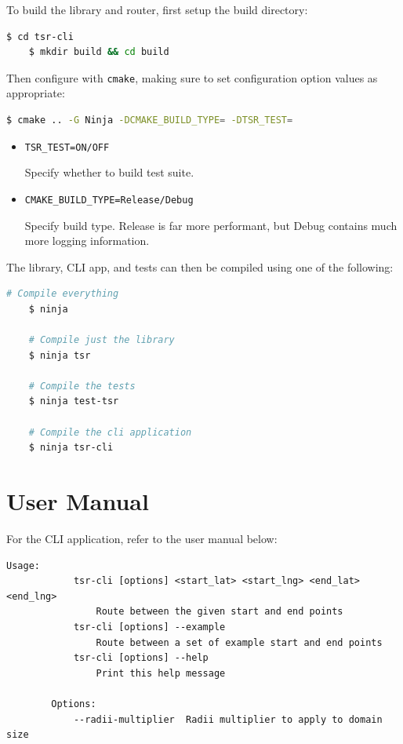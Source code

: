 \documentclass[12pt]{article}
\begin{document}
\begin{appendices}
  To build the library and router, first setup the build directory:

  \begin{lstlisting}[language=bash]
	$ cd tsr-cli
	$ mkdir build && cd build
\end{lstlisting}

  \noindent Then configure with \texttt{cmake}, making sure to set configuration option values as appropriate:

  \begin{lstlisting}[language=bash]
	$ cmake .. -G Ninja -DCMAKE_BUILD_TYPE= -DTSR_TEST=
\end{lstlisting}

  \vspace*{-2em}

  \begin{itemize}
    \item \texttt{TSR\_TEST=ON/OFF}

          Specify whether to build test suite.

    \item \texttt{CMAKE\_BUILD\_TYPE=Release/Debug}

          Specify build type. Release is far more performant, but Debug contains much more logging information.
  \end{itemize}


  \noindent The library, CLI app, and tests can then be compiled using one of the following:

  \begin{lstlisting}[language=bash]
	# Compile everything
	$ ninja

	# Compile just the library
	$ ninja tsr

	# Compile the tests
	$ ninja test-tsr

	# Compile the cli application
	$ ninja tsr-cli
\end{lstlisting}

  \pagebreak
  \section{User Manual}

  For the CLI application, refer to the user manual below:

  \begin{lstlisting}[]
	Usage: 
			tsr-cli [options] <start_lat> <start_lng> <end_lat> <end_lng>
				Route between the given start and end points
			tsr-cli [options] --example  
				Route between a set of example start and end points
			tsr-cli [options] --help
				Print this help message

		Options:
			--radii-multiplier  Radii multiplier to apply to domain size
	\end{lstlisting}

  \pagebreak
  
  

\end{appendices}
\end{document}
